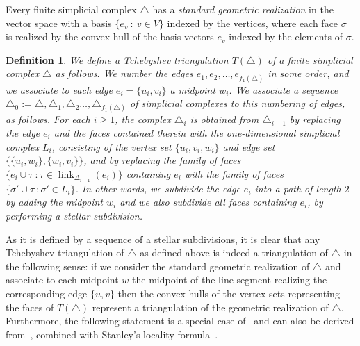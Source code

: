 \documentclass[reqno,12pt]{amsart}
\numberwithin{equation}{section}
\newtheorem{definition}[theorem]{Definition}
\DeclareMathOperator{\link}{link}
\newcommand{\0}{\widehat{0}}
\newcommand{\1}{\widehat{1}}
\newcommand{\2}{\widehat{2}}
\begin{document}
Every finite simplicial complex $\triangle$
has a {\em standard geometric realization} in the vector space with
a basis $\{e_v\::\: v\in V\}$ indexed by the vertices, where each face
$\sigma$ is realized by the convex hull of the basis vectors $e_v$
indexed by the elements of $\sigma$. 
\begin{definition}
We define a {\em Tchebyshev triangulation} $T(\triangle)$ of a finite
simplicial complex $\triangle$ as follows. We number the edges $e_1,
e_2, \ldots, e_{f_1(\triangle)}$ in some order, and we associate to each
edge $e_i=\{u_i,v_i\}$ a midpoint $w_i$. We associate a sequence
$\triangle_0:=\triangle,\triangle_{1},\triangle_{2}\ldots,\triangle_{f_1(\triangle)}$
of simplicial complexes to this numbering of edges, as
follows. For each $i\geq 1$, the complex $\triangle_{i}$ is obtained
from $\triangle_{i-1}$ by replacing the edge $e_i$ and the faces
contained therein with the one-dimensional simplicial complex $L_i$,
consisting of the vertex set $\{u_i,v_i,w_i\}$ and edge set
$\{\{u_i,w_i\}, \{w_i,v_i\}\}$,  and by replacing the family of faces
$\{e_i\cup\tau\:: \tau\in \link_{\Delta_{i-1}}(e_i)\}$ containing $e_i$
with the family of faces $\{\sigma'\cup \tau \:: \sigma'\in L_i\}$. In
other words, we subdivide the edge $e_i$ into a path of length $2$ by
adding the midpoint $w_i$ and we also subdivide all faces containing
$e_i$, by performing a stellar subdivision. 
\end{definition}  
As it is defined by a sequence of a stellar subdivisions, it is clear
that any Tchebyshev triangulation of $\triangle$ as defined above is indeed a
triangulation of $\triangle$ in the following sense: if we consider the
standard geometric realization of $\triangle$ and associate to each
midpoint $w$ the midpoint of the line segment realizing the
corresponding edge $\{u,v\}$ then the convex hulls of the vertex sets
representing the faces of $T(\triangle)$ represent a triangulation of
the geometric realization of $\triangle$. Furthermore, the
following statement is a special case of~\cite[Theorem 3.3]{Hetyei-Nevo}
and can also be derived from~\cite[Example 2.8]{Athanasiadis-survey}, combined
with Stanley's locality formula~\cite[Theorem 3.2]{Stanley-subdivisions}.
\end{document}
